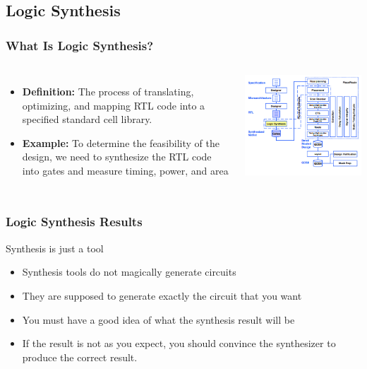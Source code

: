 \documentclass[compress]{beamer}
\begin{document}
\subsection[Synth.]{Logic Synthesis}
\begin{frame}
	\frametitle{What Is Logic Synthesis?}
		\begin{columns}	
		\begin{itemize}
			\item \textbf{Definition:} The process of translating, optimizing, and mapping RTL code into a specified standard cell library.
			\item \textbf{Example:} To determine the feasibility of the design, we need to synthesize the RTL code into gates and measure timing, power, and area
		\end{itemize}
		\begin{center}
			\includegraphics[width=\textwidth]{synthesis}
		\end{center}
	\end{columns}
\end{frame}
\begin{frame}
	\frametitle{Logic Synthesis Results}
		\begin{alertblock}{Synthesis is just a tool}
		\begin{itemize}
			\item Synthesis tools do not magically generate circuits
			\item They are supposed to generate exactly the circuit that you want
			\item You must have a good idea of what the synthesis result will be
			\pause
			\item If the result is not as you expect, you should convince the synthesizer to produce the correct result.
		\end{itemize}
	\end{alertblock}
\end{frame}
\end{document}
